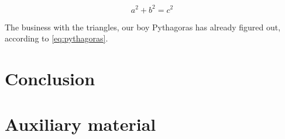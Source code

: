 \documentclass[12pt,a4paper]{scrarticle}
\begin{document}
\begin{equation}
    a^2 + b^2 = c^2
    \label{eq:pythagoras}
\end{equation}

The business with the triangles, our boy Pythagoras has already figured out, according to \autoref{eq:pythagoras}.

\section{Conclusion}

\lipsum[1] 

\appendix

\section{Auxiliary material}

\lipsum[1] 

\printbibliography{}
\end{document}
